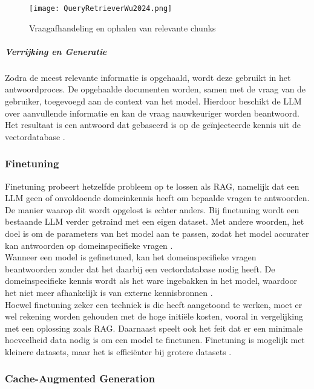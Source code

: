 \begin{figure}[H]
    \centering
    \texttt{[image: QueryRetrieverWu2024.png]}
    \caption{Vraagafhandeling en ophalen van relevante chunks \autocite{wu2025retrievalaugmentedgenerationnaturallanguage}}
    \label{fig:RAG bevragen vectordatabase}
\end{figure}

\subparagraph{Verrijking en Generatie}

Zodra de meest relevante informatie is opgehaald, wordt deze gebruikt in het antwoordproces. De opgehaalde documenten worden, samen met de vraag van de gebruiker, toegevoegd aan de context van het model. Hierdoor beschikt de LLM over aanvullende informatie en kan de vraag nauwkeuriger worden beantwoord. Het resultaat is een antwoord dat gebaseerd is op de geïnjecteerde kennis uit de vectordatabase \autocite{zhao2024retrievalaugmentedgenerationaigeneratedcontent}.


\subsubsection{Finetuning}

Finetuning probeert hetzelfde probleem op te lossen als RAG, namelijk dat een LLM geen of onvoldoende domeinkennis heeft om bepaalde vragen te antwoorden. De manier waarop dit wordt opgelost is echter anders. Bij finetuning wordt een bestaande LLM verder getraind met een eigen dataset. Met andere woorden, het doel is om de parameters van het model aan te passen, zodat het model accurater kan antwoorden op domeinspecifieke vragen \autocite{Raj2024}.
\\[1em]
Wanneer een model is gefinetuned, kan het domeinspecifieke vragen beantwoorden zonder dat het daarbij een vectordatabase nodig heeft. De domeinspecifieke kennis wordt als het ware ingebakken in het model, waardoor het niet meer afhankelijk is van externe kennisbronnen \autocite{Raj2024}.
\\[1em]
Hoewel finetuning zeker een techniek is die heeft aangetoond te werken, moet er wel rekening worden gehouden met de hoge initiële kosten, vooral in vergelijking met een oplossing zoals RAG. Daarnaast speelt ook het feit dat er een minimale hoeveelheid data nodig is om een model te finetunen. Finetuning is mogelijk met kleinere datasets, maar het is efficiënter bij grotere datasets \autocite{Balaguer2024}.

\subsubsection{Cache-Augmented Generation}

